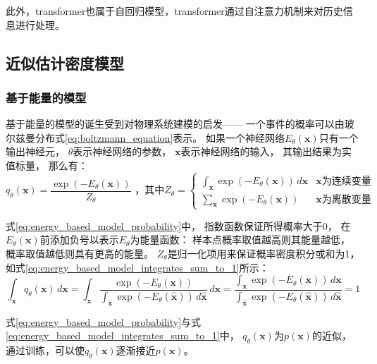此外，transformer也属于自回归模型，transformer通过自注意力机制来对历史信息进行处理。


\subsection{近似估计密度模型}
\subsubsection{基于能量的模型}
基于能量的模型的诞生受到对物理系统建模的启发——
一个事件的概率可以由玻尔兹曼分布式{\ref{eq:boltzmann_equation}}表示{\cite{lippe2022uvadlc}}。
如果一个神经网络{$E_{\theta}(\bm{x})$}只有一个输出神经元，
{$\theta$}表示神经网络的参数，
{$\bm{x}$}表示神经网络的输入，
其输出结果为实值标量，
那么有：
\begin{equation}
    \label{eq:energy_based_model_probability}
    q_{\theta}(\bm{x})=\frac{\exp(-E_{\theta}(\bm{x}))}{Z_{\theta}}
    \mbox{ ，其中}
    Z_{\theta}=
    \begin{cases}
        \int_{\bm{x}} \exp(-E_{\theta}(\bm{x})) \,d\bm{x}  & \bm{x}\mbox{为连续变量}\\
        \sum_{\bm{x}}\exp(-E_{\theta}(\bm{x}))       & \bm{x}\mbox{为离散变量}
    \end{cases}
\end{equation}

式{\ref{eq:energy_based_model_probability}}中，
指数函数保证所得概率大于0，
在{$E_{\theta}(\bm{x})$}前添加负号以表示{$E_{\theta}$}为能量函数：
样本点概率取值越高则其能量越低，
概率取值越低则具有更高的能量。
{$Z_{\theta}$}是归一化项用来保证概率密度积分或和为1，
如式{\ref{eq:energy_based_model_integrates_sum_to_1}}所示：
\begin{equation}
    \label{eq:energy_based_model_integrates_sum_to_1}
    \int_{\bm{x}} q_{\theta}(\bm{x}) \,d\bm{x} 
    = \int_{\bm{x}} \frac{\exp(-E_{\theta}(\bm{x}))}{\int_{\bm{\hat{x}}} \exp(-E_{\theta}(\bm{\hat{x}})) \,d\bm{\hat{x}}} \,d\bm{x}
    =\frac{\int_{\bm{x}} \exp(-E_{\theta}(\bm{x})) \,d\bm{x}}{\int_{\bm{\hat{x}}} \exp(-E_{\theta}(\bm{\hat{x}})) \,d\bm{\hat{x}}}
    =1
\end{equation}

式{\ref{eq:energy_based_model_probability}}与式{\ref{eq:energy_based_model_integrates_sum_to_1}}中，
{$q_{\theta}(\bm{x})$}为{$p(\bm{x})$}的近似，通过训练，可以使{$q_{\theta}(\bm{x})$}逐渐接近{$p(\bm{x})$}。

